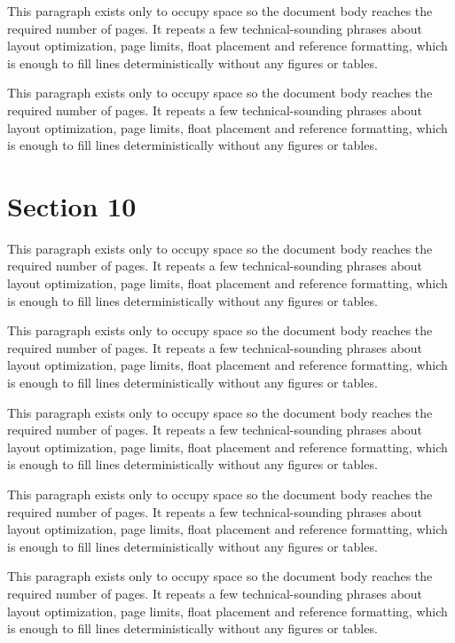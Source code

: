 \documentclass[10pt,letterpaper]{article}
\begin{document}
This paragraph exists only to occupy space so the document body reaches the required number of pages. It repeats a few technical-sounding phrases about layout optimization, page limits, float placement and reference formatting, which is enough to fill lines deterministically without any figures or tables.

This paragraph exists only to occupy space so the document body reaches the required number of pages. It repeats a few technical-sounding phrases about layout optimization, page limits, float placement and reference formatting, which is enough to fill lines deterministically without any figures or tables.

\section{Section 10}
This paragraph exists only to occupy space so the document body reaches the required number of pages. It repeats a few technical-sounding phrases about layout optimization, page limits, float placement and reference formatting, which is enough to fill lines deterministically without any figures or tables.

This paragraph exists only to occupy space so the document body reaches the required number of pages. It repeats a few technical-sounding phrases about layout optimization, page limits, float placement and reference formatting, which is enough to fill lines deterministically without any figures or tables.

This paragraph exists only to occupy space so the document body reaches the required number of pages. It repeats a few technical-sounding phrases about layout optimization, page limits, float placement and reference formatting, which is enough to fill lines deterministically without any figures or tables.

This paragraph exists only to occupy space so the document body reaches the required number of pages. It repeats a few technical-sounding phrases about layout optimization, page limits, float placement and reference formatting, which is enough to fill lines deterministically without any figures or tables.

This paragraph exists only to occupy space so the document body reaches the required number of pages. It repeats a few technical-sounding phrases about layout optimization, page limits, float placement and reference formatting, which is enough to fill lines deterministically without any figures or tables.
\end{document}
